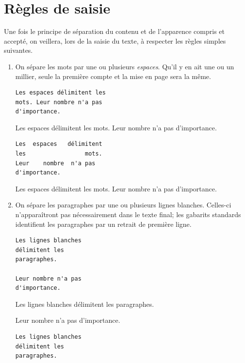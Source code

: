 \section{Règles de saisie}
\label{sec:bases:saisie}

Une fois le principe de séparation du contenu et de l'apparence
compris et accepté, on veillera, lors de la saisie du texte, à
respecter les règles simples suivantes.
\begin{enumerate}
\item On sépare les mots par une ou plusieurs \emph{espaces}. Qu'il y
  en ait une ou un millier, seule la première compte et la mise en
  page sera la même.
  \begin{demo}
    \begin{texample}
\begin{lstlisting}
Les espaces délimitent les
mots. Leur nombre n'a pas
d'importance.
\end{lstlisting}
      \producing
      Les espaces délimitent les
      mots. Leur nombre n'a pas
      d'importance.
    \end{texample}
    \begin{texample}
\begin{lstlisting}[showstringspaces=true]
Les  espaces   délimitent
les                 mots.
Leur    nombre  n'a pas
d'importance.
\end{lstlisting}
      \producing
      Les  espaces   délimitent
      les                 mots.
      Leur    nombre  n'a pas
      d'importance.
    \end{texample}
  \end{demo}
%
\item On sépare les paragraphes par une ou plusieurs lignes blanches.
  Celles-ci n'apparaîtront pas nécessairement dans le texte final; les
  gabarits standards identifient les paragraphes par un retrait de
  première ligne.
  \begin{demo}
    \begin{texample}
\begin{lstlisting}
Les lignes blanches
délimitent les
paragraphes.

Leur nombre n'a pas
d'importance.
\end{lstlisting}
      \producing
Les lignes blanches
délimitent les
paragraphes.

        Leur nombre n'a pas
        d'importance.
    \end{texample}
\begin{texample}
\begin{lstlisting}
Les lignes blanches
délimitent les
paragraphes.




\end{lstlisting}
\end{texample}
\end{demo}
\end{enumerate}
